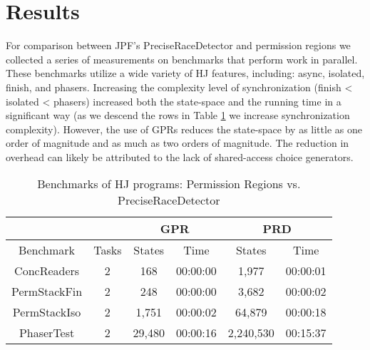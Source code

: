 \section{Results}
For comparison between JPF's PreciseRaceDetector and permission regions we
collected a series of measurements on benchmarks that perform work in parallel.
These benchmarks utilize a wide variety of HJ features, including: async,
isolated, finish, and phasers.  Increasing the complexity level of
synchronization (finish < isolated < phasers) increased both the state-space
and the running time in a significant way (as we descend the rows in Table
\ref{tab:perf} we increase synchronization complexity). However, the use of GPRs
reduces the state-space by as little as one order of magnitude and as much as
two orders of magnitude. The reduction in overhead can likely be attributed to
the lack of shared-access choice generators.

\begin{table}
\caption{Benchmarks of HJ programs: Permission Regions vs. PreciseRaceDetector}
\begin{center}
\small
\begin{tabular}{|c|c||c|c|c|c|}
\hline
\multicolumn{2}{|c|}{} & \multicolumn{2}{|c|}{GPR} & \multicolumn{2}{|c|}{PRD} \\
\hline
Benchmark & Tasks & States & Time & States & Time \\
\hline
ConcReaders & 2 & 168 & 00:00:00 & 1,977 & 00:00:01 \\
\hline
PermStackFin & 2 & 248 & 00:00:00 & 3,682 & 00:00:02 \\
\hline
PermStackIso & 2 & 1,751 & 00:00:02 & 64,879 & 00:00:18 \\
\hline
PhaserTest & 2 & 29,480 & 00:00:16 & 2,240,530 & 00:15:37 \\
\hline
\end{tabular}
\end{center}
\label{tab:perf}
\end{table}
